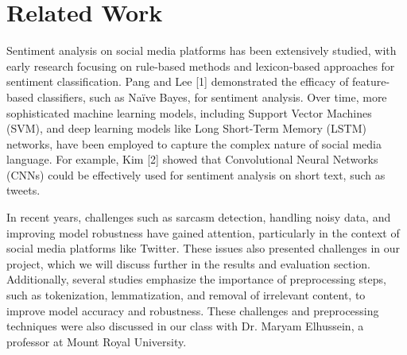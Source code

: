 \documentclass[conference]{IEEEtran}
\begin{document}
\section{Related Work}
Sentiment analysis on social media platforms has been extensively studied, with early research focusing on rule-based methods and lexicon-based approaches 
for sentiment classification. Pang and Lee [1] demonstrated the efficacy of feature-based classifiers, such as Naïve Bayes, for sentiment analysis. Over time, 
more sophisticated machine learning models, including Support Vector Machines (SVM), and deep learning models like Long Short-Term Memory (LSTM) networks, 
have been employed to capture the complex nature of social media language.
For example, Kim [2] showed that Convolutional Neural Networks (CNNs) could be effectively used for sentiment analysis on short text, such as tweets.

In recent years, challenges such as sarcasm detection, handling noisy data, and improving model robustness have gained attention, particularly 
in the context of social media platforms like Twitter. These issues also presented challenges in our project, which we will discuss further in the results 
and evaluation section. Additionally, several studies emphasize the importance of preprocessing steps, such as tokenization, lemmatization, and removal of 
irrelevant content, to improve model accuracy and robustness. These challenges and preprocessing techniques were also discussed in our class with Dr. Maryam Elhussein,
 a professor at Mount Royal University.
\end{document}
